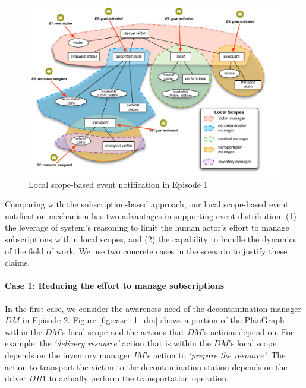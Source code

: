 \begin{figure}[htbp] %
	\centering
	\includegraphics[width=5.8in]{episode_1_ls_distribution.pdf} 
	\caption{Local scope-based event notification in Episode 1}
	\label{fig:episode_1_ls_distribution}
\end{figure}

Comparing with the subscription-based approach, our local scope-based event notification mechanism has two advantages in supporting event distribution: (1) the leverage of system's reasoning to limit the human actor's effort to manage subscriptions within local scopes, and (2) the capability to handle the dynamics of the field of work. We use two concrete cases in the scenario to justify these claims.

\paragraph*{Case 1: Reducing the effort to manage subscriptions} %
\label{par:case_1_reducing_the_effort_to_manage_subscriptions}
In the first case, we consider the awareness need of the decontamination manager $DM$ in Episode 2. Figure \ref{fig:case_1_dm} shows a portion of the PlanGraph within the $DM$'s local scope and the actions that $DM$'s actions depend on. For example, the \emph{`delivery resource'} action that is within the $DM$'s local scope depends on the inventory manager $IM$'s action to \emph{`prepare the resource'}. The action to transport the victim to the decontamination station depends on the driver $DR1$ to actually perform the transportation operation. 

